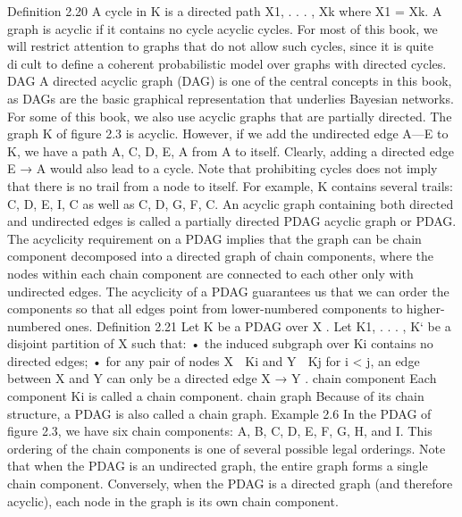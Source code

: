 Definition 2.20 A cycle in K is a directed path X1, . . . , Xk where X1 = Xk. A graph is acyclic if it contains no cycle acyclic cycles. For most of this book, we will restrict attention to graphs that do not allow such cycles, since it is quite dicult to define a coherent probabilistic model over graphs with directed cycles. DAG A directed acyclic graph (DAG) is one of the central concepts in this book, as DAGs are the basic graphical representation that underlies Bayesian networks. For some of this book, we also use acyclic graphs that are partially directed. The graph K of figure 2.3 is acyclic. However, if we add the undirected edge A—E to K, we have a path A, C, D, E, A from A to itself. Clearly, adding a directed edge E → A would also lead to a cycle. Note that prohibiting cycles does not imply that there is no trail from a node to itself. For example, K contains several trails: C, D, E, I, C as well as C, D, G, F, C. An acyclic graph containing both directed and undirected edges is called a partially directed PDAG acyclic graph or PDAG. The acyclicity requirement on a PDAG implies that the graph can be chain component decomposed into a directed graph of chain components, where the nodes within each chain component are connected to each other only with undirected edges. The acyclicity of a PDAG guarantees us that we can order the components so that all edges point from lower-numbered components to higher-numbered ones. Definition 2.21 Let K be a PDAG over X . Let K1, . . . , K` be a disjoint partition of X such that: • the induced subgraph over Ki contains no directed edges; • for any pair of nodes X ∈ Ki and Y ∈ Kj for i < j, an edge between X and Y can only be a directed edge X → Y . chain component Each component Ki is called a chain component. chain graph Because of its chain structure, a PDAG is also called a chain graph. Example 2.6 In the PDAG of figure 2.3, we have six chain components: {A}, {B}, {C, D, E}, {F, G}, {H}, and {I}. This ordering of the chain components is one of several possible legal orderings. Note that when the PDAG is an undirected graph, the entire graph forms a single chain component. Conversely, when the PDAG is a directed graph (and therefore acyclic), each node in the graph is its own chain component.


